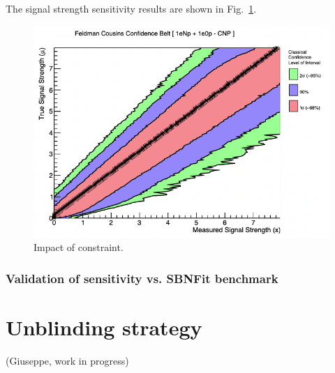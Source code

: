 \documentclass{article}
\begin{document}
The signal strength sensitivity results are shown in Fig.~\ref{fig:signalstrengthsensitivity}.
\begin{center}
\begin{figure}[h]
    \includegraphics[width=1.00\textwidth]{technote/images/signalstrengthsensitivity.png}
    \caption{\label{fig:signalstrengthsensitivity} Impact of constraint.}
\end{figure}
\end{center}

\newpage
\subsubsection{Validation of sensitivity vs. SBNFit benchmark}

\newpage
\section{Unblinding strategy}
(Giuseppe, work in progress)
\end{document}
